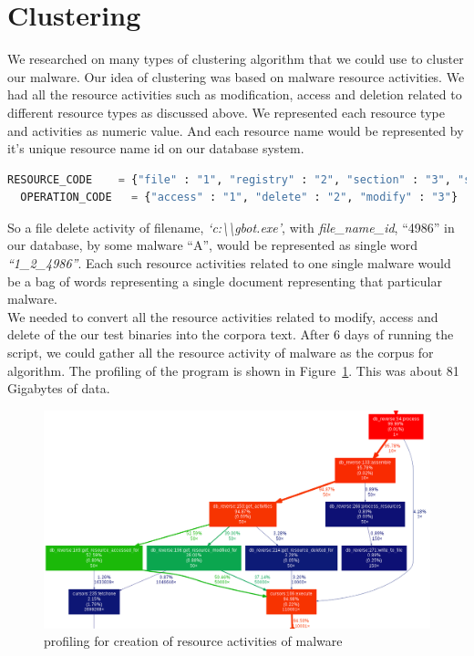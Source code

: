 \section{Clustering}
\label{sec:Clustering}
We researched on many types of clustering algorithm that we could use to cluster our malware. Our idea of clustering was based on malware resource activities.
We had all the resource activities such as modification, access and deletion related to different resource types as discussed above.
We represented each resource type and activities as numeric value. And each resource name would be represented by it's unique resource name id on our database system.
\begin{lstlisting}[language=python,caption={Numeric codes given to resource and operation},label={lbl:numericode}]
  RESOURCE_CODE    = {"file" : "1", "registry" : "2", "section" : "3", "service" : "4", "driver" : "5", "sync" : "6", "process" : "7", "job" : "8"}
  OPERATION_CODE   = {"access" : "1", "delete" : "2", "modify" : "3"}
\end{lstlisting}
So a file delete activity of filename, \textit{`c:\textbackslash\textbackslash{}gbot.exe'}, with \textit{file\_name\_id}, ``4986'' in our database, by some malware ``A'', would be represented as single word \emph{``1\_2\_4986''}. Each such resource activities related to one single malware would be a bag of words representing  a single document representing that particular malware.\\
We needed to convert all the resource activities related to modify, access and delete of the our test binaries into the corpora text.
After 6 days of running the script, we could gather all the resource activity of {\gettotalmalwareii} malware as the corpus for algorithm.
The profiling of the program is shown in Figure~\ref{fig:actcreation}.
This was about 81 Gigabytes of data.
\begin{figure}
\begin{center}
  \includegraphics[scale=0.3]{figures/activities_creation.png}
\end{center}
\caption{profiling for creation of resource activities of malware}
\label{fig:actcreation}
\end{figure}
